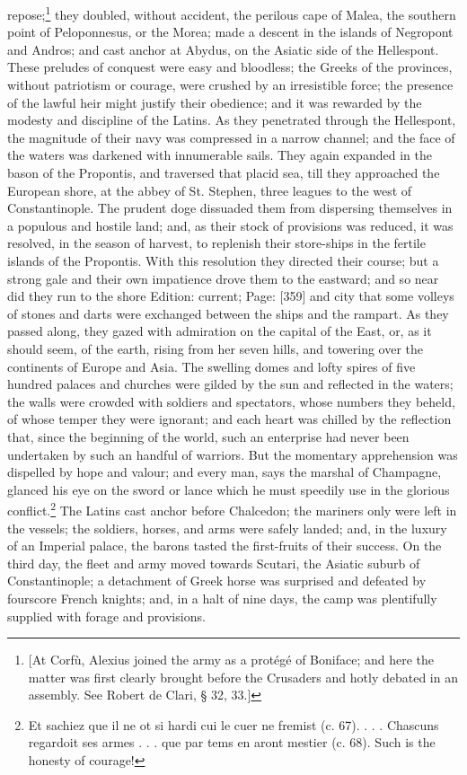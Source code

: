 repose;\footnote{[At Corfù, Alexius joined the army as a protégé of Boniface; and here the matter was first clearly brought before the Crusaders and hotly debated in an assembly. See Robert de Clari, § 32, 33.]} they doubled, without accident, the perilous cape of Malea, the southern point of Peloponnesus, or the Morea; made a descent in the islands of Negropont and Andros; and cast anchor at Abydus, on the Asiatic side of the Hellespont. These preludes of conquest were easy and bloodless; the Greeks of the provinces, without patriotism or courage, were crushed by an irresistible force; the presence of the lawful heir might justify their obedience; and it was rewarded by the modesty and discipline of the Latins. As they penetrated through the Hellespont, the magnitude of their navy was compressed in a narrow channel; and the face of the waters was darkened with innumerable sails. They again expanded in the bason of the Propontis, and traversed that placid sea, till they approached the European shore, at the abbey of St. Stephen, three leagues to the west of Constantinople. The prudent doge dissuaded them from dispersing themselves in a populous and hostile land; and, as their stock of provisions was reduced, it was resolved, in the season of harvest, to replenish their store-ships in the fertile islands of the Propontis. With this resolution they directed their course; but a strong gale and their own impatience drove them to the eastward; and so near did they run to the shore Edition: current; Page: [359] and city that some volleys of stones and darts were exchanged between the ships and the rampart. As they passed along, they gazed with admiration on the capital of the East, or, as it should seem, of the earth, rising from her seven hills, and towering over the continents of Europe and Asia. The swelling domes and lofty spires of five hundred palaces and churches were gilded by the sun and reflected in the waters; the walls were crowded with soldiers and spectators, whose numbers they beheld, of whose temper they were ignorant; and each heart was chilled by the reflection that, since the beginning of the world, such an enterprise had never been undertaken by such an handful of warriors. But the momentary apprehension was dispelled by hope and valour; and every man, says the marshal of Champagne, glanced his eye on the sword or lance which he must speedily use in the glorious conflict.\footnote{Et sachiez que il ne ot si hardi cui le cuer ne fremist (c. 67). . . . Chascuns regardoit ses armes . . . que par tems en aront mestier (c. 68). Such is the honesty of courage!} The Latins cast anchor before Chalcedon; the mariners only were left in the vessels; the soldiers, horses, and arms were safely landed; and, in the luxury of an Imperial palace, the barons tasted the first-fruits of their success. On the third day, the fleet and army moved towards Scutari, the Asiatic suburb of Constantinople; a detachment of Greek horse was surprised and defeated by fourscore French knights; and, in a halt of nine days, the camp was plentifully supplied with forage and provisions.

